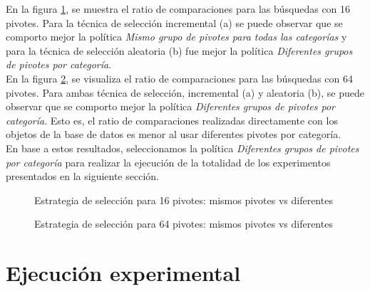 En la figura \ref{fig:same-vs-diff-16Pivotes}, se muestra el ratio de comparaciones para las b\'usquedas con 16 pivotes. Para la t\'ecnica de selecci\'on incremental (a) se puede observar que se comporto mejor la pol\'itica \textit{Mismo grupo de pivotes para todas las categor\'ias} y para la t\'ecnica de selecci\'on aleatoria (b) fue mejor la pol\'itica \textit{Diferentes grupos de pivotes por categor\'ia}.\\

En la figura \ref{fig:same-vs-diff-64Pivotes}, se visualiza el ratio de comparaciones para las b\'usquedas con 64 pivotes. Para ambas t\'ecnica de selecci\'on, incremental (a) y aleatoria (b), se puede observar que se comporto mejor la pol\'itica \textit{Diferentes grupos de pivotes por categor\'ia}. Esto es, el ratio de comparaciones realizadas directamente con los objetos de la base de datos es menor al usar diferentes pivotes por categor\'ia.\\

En base a estos resultados, seleccionamos la pol\'itica \textit{Diferentes grupos de pivotes por categor\'ia} para realizar la ejecuci\'on de la totalidad de los experimentos presentados en la siguiente secci\'on.\\

\begin{figure}[tb]
\centering
{}
		\caption{\small Estrategia de selecci\'on para 16 pivotes: mismos pivotes vs diferentes}
		\label{fig:same-vs-diff-16Pivotes}
\end{figure}

\begin{figure}[tb]
\centering
{}
		\caption{\small Estrategia de selecci\'on para 64 pivotes: mismos pivotes vs diferentes}
		\label{fig:same-vs-diff-64Pivotes}
\end{figure}

\section{Ejecuci\'on experimental}

